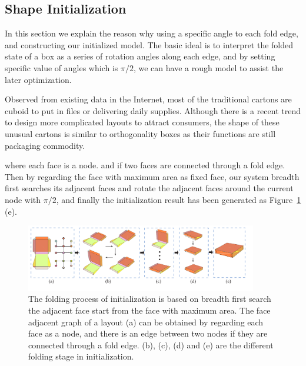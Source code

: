 \subsection{Shape Initialization}\label{sec:initialization}


In this section we explain the reason why using a specific angle to each fold edge, and constructing our initialized model. The basic ideal is to interpret the folded state of a box as a series of rotation angles along each edge, and by setting specific value of angles which is $\pi/2$, we can have a rough model to assist the later optimization.
		
Observed from existing data in the Internet, most of the traditional cartons are cuboid to put in files or delivering daily supplies. Although there is a recent trend to design more complicated layouts to attract consumers, the shape of these unusual cartons is similar to orthogonality boxes as their functions are still packaging commodity. 


{ where each face is a node. and if two faces are connected through a fold edge. Then by regarding the face with maximum area as fixed face, our system breadth first searches its adjacent faces and rotate the adjacent faces around the current node with $\pi/2$, and finally the initialization result has been generated as Figure~\ref{fig:midresult} (e).} 

\begin{figure}[ht]
	\centering
	\includegraphics[width=0.9\textwidth]{images/midresult}
	\caption{The folding process of initialization is based on breadth first search the adjacent face start from the face with maximum area. The face adjacent graph of a layout (a) can be obtained by regarding each face as a node, and there is an edge between two nodes if they are connected through a fold edge. (b), (c), (d) and (e) are the different folding stage in initialization.}
	\label{fig:midresult}
\end{figure}

